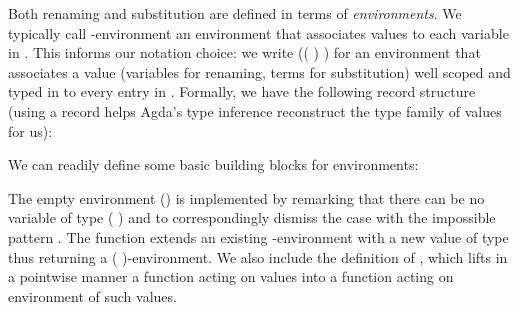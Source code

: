 Both renaming and substitution are defined in terms of \emph{environments}.
We typically call -environment an environment that associates values
to each variable in . This informs our notation choice: we write
{(( )  )} for an environment that associates
a value  (variables for renaming, terms for substitution) well scoped
and typed in  to every entry in . Formally, we have the following
record structure (using a record helps Agda's type inference reconstruct the
type family  of values for us):

\begin{center}
\end{center}


We can readily define some basic building blocks for environments:
\begin{center}
\begin{minipage}[t]{0.3\textwidth}
\end{minipage}\begin{minipage}[t]{0.6\textwidth}
\end{minipage}
\end{center}
The empty environment () is implemented
by remarking that there can be no variable of type
{(  \AIC{[]})} and to correspondingly dismiss the case with
the impossible pattern \AS{()}. The function  extends an existing
-environment with a new value of type  thus returning a
{(  )}-environment. We also include the definition
of \AF{\_<\$>\_}, which lifts in a pointwise manner a function acting
on values into a function acting on environment of such values.

